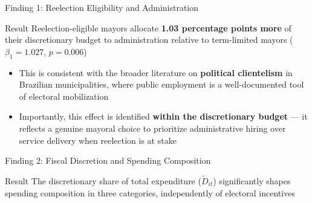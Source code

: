 \documentclass{beamer}
\begin{document}
\begin{frame}{Finding 1: Reelection Eligibility and Administration}
\begin{block}{Result}
Reelection-eligible mayors allocate \textbf{1.03 percentage points more} of their discretionary budget to administration relative to term-limited mayors ($\beta_1 = 1.027$, $p = 0.006$)
\end{block}
\vspace{1em}
\begin{itemize}
    \item This is consistent with the broader literature on \textbf{political clientelism} in Brazilian municipalities, where public employment is a well-documented tool of electoral mobilization
    \vspace{1em}
    \item Importantly, this effect is identified \textbf{within the discretionary budget} --- it reflects a genuine mayoral choice to prioritize administrative hiring over service delivery when reelection is at stake
\end{itemize}
\end{frame}

\begin{frame}{Finding 2: Fiscal Discretion and Spending Composition}
\begin{block}{Result}
The discretionary share of total expenditure ($\tilde{D}_{it}$) significantly shapes spending composition in three categories, independently of electoral incentives
\end{block}
\vspace{0.5em}
\begin{table}
\centering
{}
\end{table}
\vspace{0.5em}
\end{frame}
\end{document}
